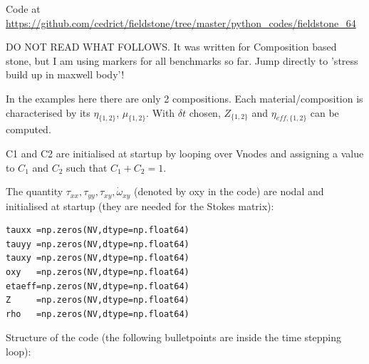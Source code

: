 Code at \url{https://github.com/cedrict/fieldstone/tree/master/python_codes/fieldstone_64}

{\large
DO NOT READ WHAT FOLLOWS. It was written for Composition based stone, but I am using 
markers for all benchmarks so far. Jump directly to 'stress build up in maxwell body'! 
}

In the examples here there are only 2 compositions. 
Each material/composition is characterised by its $\eta_{\{1,2\}}$, $\mu_{\{1,2\}}$. 
With $\delta t$ chosen, $Z_{\{1,2\}}$ and $\eta_{eff,\{1,2\}}$ can be computed.

C1 and C2 are initialised at startup by looping over Vnodes and assigning a value to $C_1$ 
and $C_2$ such that $C_1+C_2=1$. 

The quantity $\tau_{xx},\tau_{yy},\tau_{xy},\dot{\omega}_{xy}$ (denoted by oxy in the code) 
are nodal and initialised at startup
(they are needed for the Stokes matrix):
\begin{lstlisting}
tauxx =np.zeros(NV,dtype=np.float64)  
tauyy =np.zeros(NV,dtype=np.float64)  
tauxy =np.zeros(NV,dtype=np.float64)  
oxy   =np.zeros(NV,dtype=np.float64)  
etaeff=np.zeros(NV,dtype=np.float64)  
Z     =np.zeros(NV,dtype=np.float64)  
rho   =np.zeros(NV,dtype=np.float64)  
\end{lstlisting}

Structure of the code (the following bulletpoints are inside the time stepping loop):

